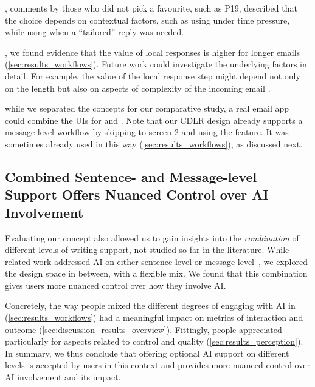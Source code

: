 , comments by those who did not pick a favourite, such as P19, described that the choice depends on contextual factors, such as using \modemail{} under time pressure, while using \modeours{} when a ``tailored'' reply was needed.

, we found evidence that the value of local responses is higher for longer emails (\cref{sec:results_workflows}). Future work could investigate the underlying factors in detail. For example, the value of the local response step  might depend not only on the length but also on aspects of complexity of the incoming email .

 while we separated the concepts for our comparative study, a real email app could combine the UIs for \modeours{} and \modemail. %
Note that our CDLR design already supports a message-level workflow by skipping to screen 2 and using the \imppass{} feature. %
It was sometimes already used in this way (\cref{sec:results_workflows}), as discussed next.




\subsection{Combined Sentence- and Message-level Support Offers Nuanced Control over AI Involvement}

Evaluating our \modeours{} concept also allowed us to gain insights into the \textit{combination} of different levels of writing support, not studied so far in the literature. 
While related work addressed AI on either sentence-level or message-level~\cite{Fu2023sentencevsmessage, Chen2019smartcompose, Kannan2016smartreply}, we explored the design space in between, with a flexible mix. %
We found that this combination gives users more nuanced control over how they involve AI. 

Concretely, the way people mixed the different degrees of engaging with AI  in \modeours{} (\cref{sec:results_workflows}) had a meaningful impact on metrics of interaction and outcome (\cref{sec:discussion_results_overview}). 
Fittingly, people appreciated \modeours{} particularly for aspects related to control and quality (\cref{sec:results_perception}). %
In summary, we thus conclude that offering optional AI support on different levels is accepted by users in this context and provides more nuanced control over AI involvement and its impact. %




